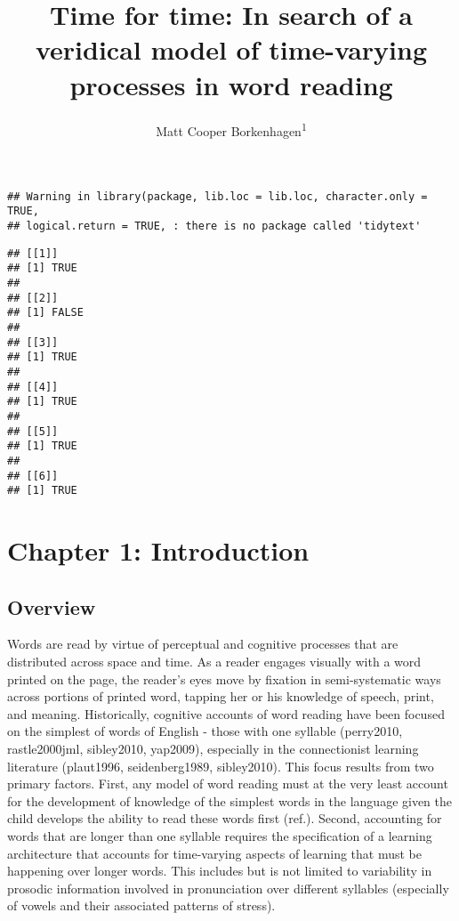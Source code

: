 \documentclass[
  american,
  man,floatsintext]{apa6}
\title{Time for time: In search of a veridical model of time-varying processes in word reading}
\author{Matt Cooper Borkenhagen\textsuperscript{1}}
\date{}
\affiliation{\vspace{0.5cm}\textsuperscript{1} Department of Psychology, University of Wisconsin, Madison}
\begin{document}
\maketitle

\begin{verbatim}
## Warning in library(package, lib.loc = lib.loc, character.only = TRUE,
## logical.return = TRUE, : there is no package called 'tidytext'
\end{verbatim}

\begin{verbatim}
## [[1]]
## [1] TRUE
## 
## [[2]]
## [1] FALSE
## 
## [[3]]
## [1] TRUE
## 
## [[4]]
## [1] TRUE
## 
## [[5]]
## [1] TRUE
## 
## [[6]]
## [1] TRUE
\end{verbatim}

\hypertarget{chapter-1-introduction}{%
\section{Chapter 1: Introduction}\label{chapter-1-introduction}}

\hypertarget{overview}{%
\subsection{Overview}\label{overview}}

Words are read by virtue of perceptual and cognitive processes that are distributed across space and time. As a reader engages visually with a word printed on the page, the reader's eyes move by fixation in semi-systematic ways across portions of printed word, tapping her or his knowledge of speech, print, and meaning. Historically, cognitive accounts of word reading have been focused on the simplest of words of English - those with one syllable (perry2010, rastle2000jml, sibley2010, yap2009), especially in the connectionist learning literature (plaut1996, seidenberg1989, sibley2010). This focus results from two primary factors. First, any model of word reading must at the very least account for the development of knowledge of the simplest words in the language given the child develops the ability to read these words first (ref.). Second, accounting for words that are longer than one syllable requires the specification of a learning architecture that accounts for time-varying aspects of learning that must be happening over longer words. This includes but is not limited to variability in prosodic information involved in pronunciation over different syllables (especially of vowels and their associated patterns of stress).
\end{document}
